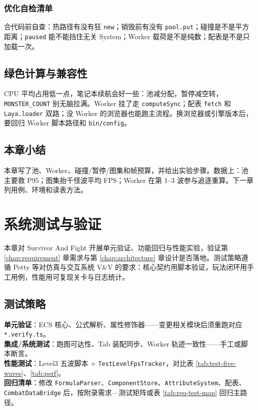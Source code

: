 \documentclass[UTF8,a4paper]{ctexart}
\begin{document}
\subsection{优化自检清单}

合代码前自查：热路径有没有狂 \texttt{new}；销毁前有没有 \texttt{pool.put}；碰撞是不是平方距离；\texttt{paused} 能不能挡住无关 System；Worker 载荷是不是纯数；配表是不是只加载一次。

\section{绿色计算与兼容性}

CPU 平均占用低一点，笔记本续航会好一些：池减分配，暂停减空转，\texttt{MONSTER\_COUNT} 别无脑拉满。Worker 挂了走 \texttt{computeSync}；配表 \texttt{fetch} 和 \texttt{Laya.loader} 双路；没 Worker 的浏览器也能跑主流程。换浏览器或引擎版本后，要回归 Worker 脚本路径和 \texttt{bin/config}。

\section{本章小结}

本章写了池、Worker、碰撞/暂停/图集和帧预算，并给出实验步骤。数据上：池主要救 P95；图集抬千怪波平均 FPS；Worker 在第 1--3 波参与追逐重算。下一章列用例、环境和读表方法。

\chapter{系统测试与验证}
\label{chap:test}

本章对 Survivor And Fight 开展单元验证、功能回归与性能实验，验证第 \ref{chap:requirement} 章需求与第 \ref{chap:architecture} 章设计是否落地。测试策略遵循 Petty 等对仿真与交互系统 V\&V 的要求\cite{petty2010vv,oberkampf2010vv}：核心契约用脚本验证，玩法闭环用手工用例，性能用可复现关卡与日志统计。

\section{测试策略}

\textbf{单元验证}：ECS 核心、公式解析、属性修饰器——变更相关模块后须重跑对应 \texttt{*.verify.ts}。\\
\textbf{集成/系统测试}：跑图可达性、Tab 装配同步、Worker 轨迹一致性——手工或脚本断言。\\
\textbf{性能测试}：Level3 五波脚本 + \texttt{TestLevelFpsTracker}，对比表 \ref{tab:test-five-waves}、\ref{tab:perf}。\\
\textbf{回归清单}：修改 \texttt{FormulaParser}、\texttt{ComponentStore}、\texttt{AttributeSystem}、配表、\texttt{CombatDataBridge} 后，按附录需求—测试矩阵或表 \ref{tab:req-test-map} 回归主路径。
\end{document}
